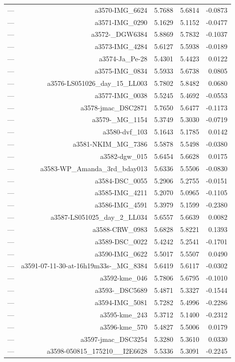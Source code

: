 \begin{table}[htbp]
\begin{tabular}{lrrrr}
— & a3570-IMG_6624 & 5.7688 & 5.6814 & -0.0873 \\
— & a3571-IMG_0290 & 5.1629 & 5.1152 & -0.0477 \\
— & a3572-_DGW6384 & 5.8869 & 5.7832 & -0.1037 \\
— & a3573-IMG_4284 & 5.6127 & 5.5938 & -0.0189 \\
— & a3574-Ja_Pe-28 & 5.4301 & 5.4423 & 0.0122 \\
— & a3575-IMG_0834 & 5.5933 & 5.6738 & 0.0805 \\
— & a3576-LS051026_day_15_LL003 & 5.7802 & 5.8482 & 0.0680 \\
— & a3577-IMG_0038 & 5.5245 & 5.4692 & -0.0553 \\
— & a3578-jmac_DSC2871 & 5.7650 & 5.6477 & -0.1173 \\
— & a3579-_MG_1154 & 5.3749 & 5.3030 & -0.0719 \\
— & a3580-dvf_103 & 5.1643 & 5.1785 & 0.0142 \\
— & a3581-NKIM_MG_7386 & 5.5878 & 5.5498 & -0.0380 \\
— & a3582-dgw_015 & 5.6454 & 5.6628 & 0.0175 \\
— & a3583-WP_Amanda_3rd_bday013 & 5.6336 & 5.5506 & -0.0830 \\
— & a3584-DSC_0055 & 5.2906 & 5.2755 & -0.0151 \\
— & a3585-IMG_4211 & 5.2070 & 5.0965 & -0.1105 \\
— & a3586-IMG_4591 & 5.3979 & 5.1599 & -0.2380 \\
— & a3587-LS051025_day_2_LL034 & 5.6557 & 5.6639 & 0.0082 \\
— & a3588-CRW_0983 & 5.6828 & 5.8221 & 0.1393 \\
— & a3589-DSC_0022 & 5.4242 & 5.2541 & -0.1701 \\
— & a3590-IMG_0622 & 5.5017 & 5.5507 & 0.0490 \\
— & a3591-07-11-30-at-16h19m33s-_MG_8384 & 5.6419 & 5.6117 & -0.0302 \\
— & a3592-kme_046 & 5.7806 & 5.6795 & -0.1010 \\
— & a3593-_DSC5689 & 5.4871 & 5.3327 & -0.1544 \\
— & a3594-IMG_5081 & 5.7282 & 5.4996 & -0.2286 \\
— & a3595-kme_243 & 5.3712 & 5.1400 & -0.2312 \\
— & a3596-kme_570 & 5.4827 & 5.5006 & 0.0179 \\
— & a3597-jmac_DSC3254 & 5.3280 & 5.3610 & 0.0330 \\
— & a3598-050815_175210__I2E6628 & 5.5336 & 5.3091 & -0.2245 \\

\end{tabular}
\end{table}
